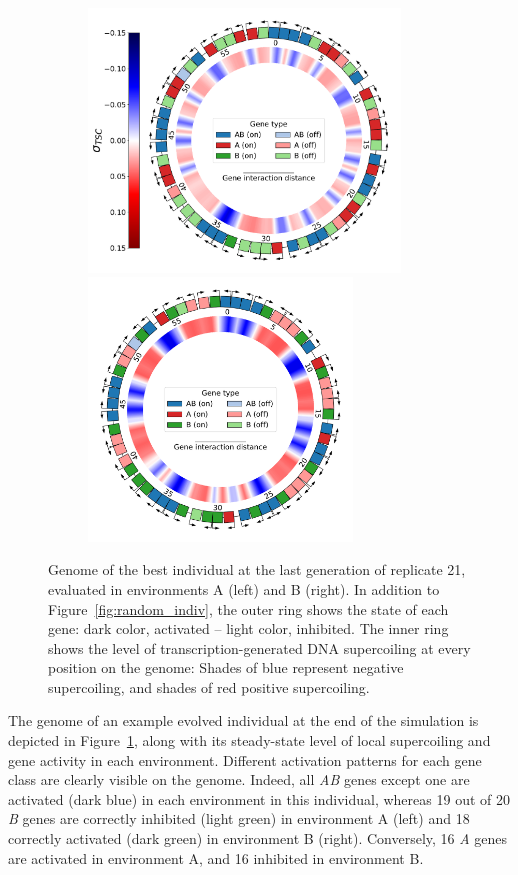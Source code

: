 \begin{figure}[H]
  \centering
  \begin{subfigure}[t]{\textwidth}
    \centering
    \includegraphics[height=7cm]{ploscb/img/genome_and_tsc_rep21_env_A.pdf}
    \hspace{-0.5cm}
    \includegraphics[height=7cm]{ploscb/img/genome_and_tsc_rep21_env_B.pdf}
  \end{subfigure}
  \caption{Genome of the best individual at the last generation of replicate 21, evaluated in environments A (left) and B (right).
  In addition to Figure~\ref{fig:random_indiv}, the outer ring shows the state of each gene: dark color, activated -- light color, inhibited.
  The inner ring shows the level of transcription-generated DNA supercoiling at every position on the genome: Shades of blue represent negative supercoiling, and shades of red positive supercoiling.}
  \label{fig:genomes}
\end{figure}

The genome of an example evolved individual at the end of the simulation is depicted in Figure~\ref{fig:genomes}, along with its steady-state level of local supercoiling and gene activity in each environment.
Different activation patterns for each gene class are clearly visible on the genome.
Indeed, all \emph{AB} genes except one are activated (dark blue) in each environment in this individual, whereas 19 out of 20 \emph{B} genes are correctly inhibited (light green) in environment A (left) and 18 correctly activated (dark green) in environment B (right).
Conversely, 16 \emph{A} genes are activated in environment A, and 16 inhibited in environment B.

